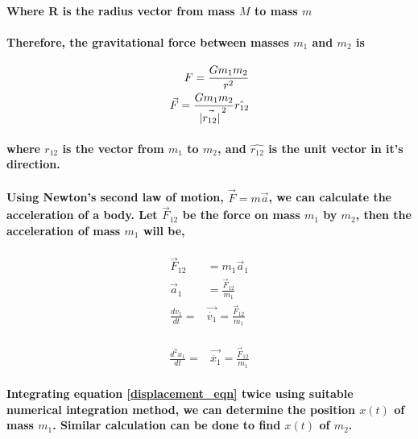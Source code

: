 \paragraph{Where R is the radius vector from mass $M$ to mass $m$}
\paragraph{Therefore, the gravitational force between masses $m_1$ and $m_2$ is}

\begin{equation}\label{force_eqn}
\begin{split}
    F = \frac{G m_1 m_2}{r^2}\\
    \vec{F} = \frac{G m_1 m_2}{\vec{\abs{r_{12}}}^{\, 2}} \hat{r_{12}}
\end{split}
\end{equation}

\paragraph{where $r_{12}$ is the vector from $m_1$ to $m_2$, and $\hat{r_{12}}$ is the unit vector in it's direction.}

\paragraph{Using Newton's second law of motion, $\vec F=m \vec a$, we can calculate the acceleration of a body. Let $\vec F_{12}$ be the force on mass $m_1$ by $m_2$, then the acceleration of mass $m_1$ will be,}

\begin{equation}
\begin{split}
    \vec F_{12} &= m_{1}\vec a_1\\
    \vec a_1 &= \frac{\vec F_{12}}{m_1}\\
    \frac{dv_1}{dt} ={} &{} \vec{\dot{v_1}} = \frac{\vec F_{12}}{m_1}\\
\end{split}
\end{equation}

\begin{equation}
\begin{split}
\frac{d^2x_1}{dt} ={} &{} \vec{\ddot {x_1}} = \frac{\vec F_{12}}{m_1} \label{displacement_eqn}
\end{split}
\end{equation}

\paragraph{Integrating equation \ref{displacement_eqn} twice using suitable numerical integration method, we can determine the position $x(t)$ of mass $m_1$. Similar calculation can be done to find $x(t)$ of $m_2$. }

